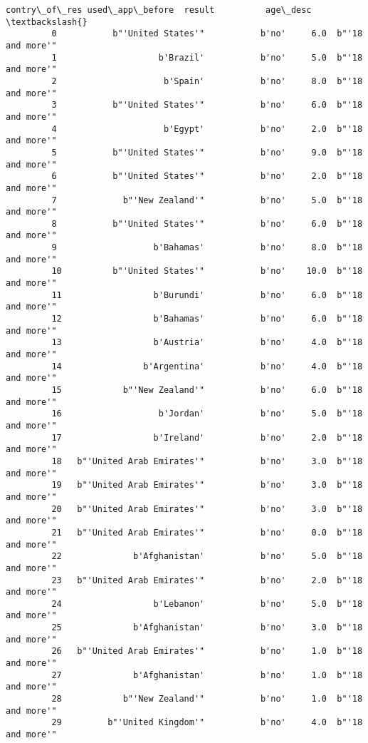\documentclass[11pt]{article}
\begin{document}
\begin{Verbatim}[commandchars=\\\{\}]
                          contry\_of\_res used\_app\_before  result          age\_desc  \textbackslash{}
         0           b"'United States'"           b'no'     6.0  b"'18 and more'"   
         1                    b'Brazil'           b'no'     5.0  b"'18 and more'"   
         2                     b'Spain'           b'no'     8.0  b"'18 and more'"   
         3           b"'United States'"           b'no'     6.0  b"'18 and more'"   
         4                     b'Egypt'           b'no'     2.0  b"'18 and more'"   
         5           b"'United States'"           b'no'     9.0  b"'18 and more'"   
         6           b"'United States'"           b'no'     2.0  b"'18 and more'"   
         7             b"'New Zealand'"           b'no'     5.0  b"'18 and more'"   
         8           b"'United States'"           b'no'     6.0  b"'18 and more'"   
         9                   b'Bahamas'           b'no'     8.0  b"'18 and more'"   
         10          b"'United States'"           b'no'    10.0  b"'18 and more'"   
         11                  b'Burundi'           b'no'     6.0  b"'18 and more'"   
         12                  b'Bahamas'           b'no'     6.0  b"'18 and more'"   
         13                  b'Austria'           b'no'     4.0  b"'18 and more'"   
         14                b'Argentina'           b'no'     4.0  b"'18 and more'"   
         15            b"'New Zealand'"           b'no'     6.0  b"'18 and more'"   
         16                   b'Jordan'           b'no'     5.0  b"'18 and more'"   
         17                  b'Ireland'           b'no'     2.0  b"'18 and more'"   
         18   b"'United Arab Emirates'"           b'no'     3.0  b"'18 and more'"   
         19   b"'United Arab Emirates'"           b'no'     3.0  b"'18 and more'"   
         20   b"'United Arab Emirates'"           b'no'     3.0  b"'18 and more'"   
         21   b"'United Arab Emirates'"           b'no'     0.0  b"'18 and more'"   
         22              b'Afghanistan'           b'no'     5.0  b"'18 and more'"   
         23   b"'United Arab Emirates'"           b'no'     2.0  b"'18 and more'"   
         24                  b'Lebanon'           b'no'     5.0  b"'18 and more'"   
         25              b'Afghanistan'           b'no'     3.0  b"'18 and more'"   
         26   b"'United Arab Emirates'"           b'no'     1.0  b"'18 and more'"   
         27              b'Afghanistan'           b'no'     1.0  b"'18 and more'"   
         28            b"'New Zealand'"           b'no'     1.0  b"'18 and more'"   
         29         b"'United Kingdom'"           b'no'     4.0  b"'18 and more'"   

\end{Verbatim}
\end{document}
